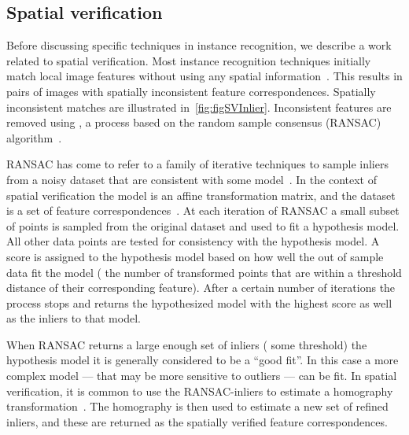     \subsection{Spatial verification}\label{subsec:sverreview}

        Before discussing specific techniques in instance recognition, we describe a work related to spatial
        verification. Most instance recognition techniques initially match local image features without using any
        spatial information~\cite{lowe_distinctive_2004,sivic_efficient_2009,philbin_object_2007,tolias_image_2015}.
        This results in pairs of images with spatially inconsistent feature correspondences. Spatially inconsistent
        matches are illustrated in~\cref{fig:figSVInlier}. Inconsistent features are removed using , a process based on the random sample consensus (RANSAC) algorithm~\cite{fischler_random_1981}.

        RANSAC has come to refer to a family of iterative techniques to sample inliers from a noisy dataset that are
        consistent with some model~\cite{fischler_random_1981, hartley_multiple_2003, chum_locally_2003,
        raguram_usac_2013}. In the context of spatial verification the model is an affine transformation matrix, and the
        dataset is a set of feature correspondences~\cite{lowe_distinctive_2004, sivic_video_2003, philbin_object_2007,
        chum_total_2011, arandjelovic_three_2012}. At each iteration of RANSAC a small subset of points is sampled from
        the original dataset and used to fit a hypothesis model. All other data points are tested for consistency with
        the hypothesis model. A score is assigned to the hypothesis model based on how well the out of sample data fit
        the model (\eg{} the number of transformed points that are within a threshold distance of their corresponding
        feature). After a certain number of iterations the process stops and returns the hypothesized model with the
        highest score as well as the inliers to that model.

        When RANSAC returns a large enough set of inliers (\wrt{} some threshold) the hypothesis model it is generally
        considered to be a ``good fit''. In this case a more complex model --- that may be more sensitive to outliers
        --- can be fit. In spatial verification, it is common to use the RANSAC-inliers to estimate a homography
        transformation~\cite[311--320]{szeliski_computer_2010}. The homography is then used to estimate a new set of
        refined inliers, and these are returned as the spatially verified feature correspondences.

